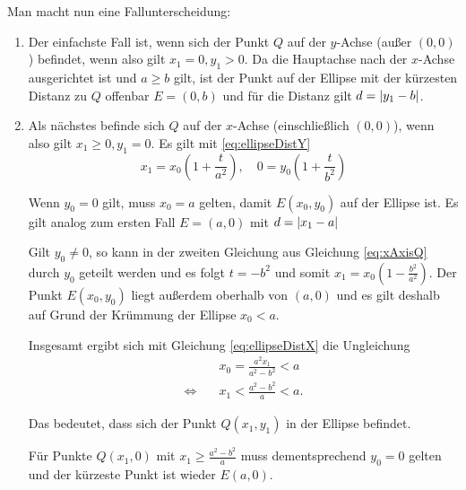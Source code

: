 \bigskip
Man macht nun eine Fallunterscheidung:
\begin{enumerate}
	\item Der einfachste Fall ist, wenn sich der Punkt $Q$ auf der $y$-Achse (außer $(0,0)$) befindet, wenn also gilt $x_1 = 0, y_1 > 0$.
	Da die Hauptachse nach der $x$-Achse ausgerichtet ist und $a \geq b$ gilt, ist der Punkt auf der Ellipse mit der kürzesten Distanz zu $Q$ offenbar $E = (0, b)$ und für die Distanz gilt $d = \lvert y_1 - b\rvert$.
	\item Als nächstes befinde sich $Q$ auf der $x$-Achse (einschließlich $(0,0)$), wenn also gilt  $x_1 \geq 0, y_1 = 0$. Es gilt mit \ref{eq:ellipseDistY}
	\begin{equation} \label{eq:xAxisQ}
		x_1 = x_0\left(1 + \frac{t}{a^2}\right), \quad 0 = y_0\left(1 + \frac{t}{b^2}\right)
	\end{equation}

	Wenn $y_0 = 0$ gilt, muss $x_0 = a$ gelten, damit $E(x_0,y_0)$ auf der Ellipse ist. Es  gilt analog zum ersten Fall $E=(a,0)$ mit $d = \lvert x_1 - a\rvert$

	Gilt $y_0 \neq 0$, so kann in der zweiten Gleichung aus Gleichung \ref{eq:xAxisQ} durch $y_0$ geteilt werden und es folgt $t = -b^2$ und somit $x_1 = x_0\left(1 - \frac{b^2}{a^2}\right)$. Der Punkt $E(x_0,y_0)$ liegt außerdem oberhalb von $(a,0)$ und es gilt deshalb auf Grund der Krümmung der Ellipse $x_0 < a$.

	Insgesamt ergibt sich mit Gleichung \ref{eq:ellipseDistX} die Ungleichung
	\[
	\begin{aligned}
		&x_0 = \frac{a^2x_1}{a^2 - b^2} < a \\
		\Leftrightarrow\quad &x_1 < \frac{a^2 - b^2}{a} < a.
	\end{aligned}
	\] %

	Das bedeutet, dass sich der Punkt $Q(x_1,y_1)$ in der Ellipse befindet.

	Für Punkte $Q(x_1,0)$ mit $x_1 \geq \frac{a^2 - b^2}{a}$ muss dementsprechend $y_0 = 0$ gelten und der kürzeste Punkt ist wieder $E(a,0)$.


\end{enumerate}
